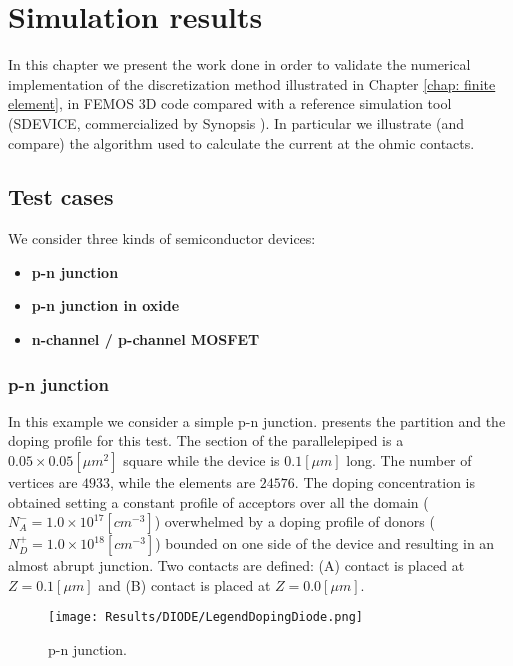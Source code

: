 \chapter{Simulation results}
\label{chap: results}

In this chapter we present the work done in order to validate the numerical implementation of the discretization method illustrated in Chapter \ref{chap: finite element}, in FEMOS 3D code compared with a reference simulation tool (SDEVICE, commercialized by Synopsis \cite{SdeviceManual}).
In particular we illustrate (and compare) the algorithm used to calculate the current at the ohmic contacts.

\section{Test cases}

We consider three kinds of semiconductor devices: 

\begin{itemize}
\setlength{\itemsep}{0.5pt}
\item {\bf p-n junction}
\item {\bf p-n junction in oxide}
\item {\bf n-channel / p-channel MOSFET}
\end{itemize}

\subsection{p-n junction}
\label{sec: PN}

In this example we consider a simple p-n junction.  presents the partition and the doping profile for this test. The section of the parallelepiped is a $0.05 \times 0.05 [\mu m^2]$ square while the device is $0.1 [\mu m]$ long.  The number of vertices are $4933$, while the elements are $24576$.  The doping concentration is obtained setting a constant profile of acceptors over all the domain ($N_A^- = 1.0\times 10^{17} [cm^{-3}]$) overwhelmed by a doping profile of  donors ($N_D^+=1.0 \times 10^{18} [cm^{-3}]$) bounded on one side of the device and resulting in an almost abrupt junction. 
Two contacts are defined: (A) contact is placed at $Z=0.1[\mu m]$ and (B) contact is placed at $Z=0.0 [\mu m]$.  


\begin{figure}[!t]
\centering
{}
\hspace{0.06\textwidth}
\hspace{0.04\textwidth}
{\texttt{[image: Results/DIODE/LegendDopingDiode.png]}}
\caption{p-n junction.}
\label{fig: diodo struttura}
\end{figure}



